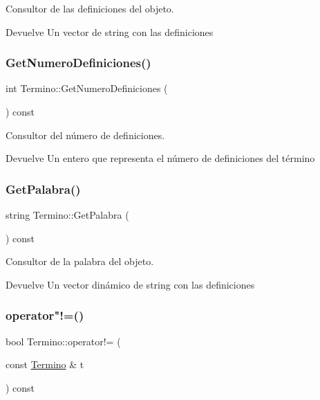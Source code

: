 Consultor de las definiciones del objeto. 

\begin{DoxyReturn}{Devuelve}
Un vector de string con las definiciones 
\end{DoxyReturn}
\mbox{\label{classTermino_ad3aac507f0f33d89abf34db00f92606f}} 
\subsubsection{\texorpdfstring{Get\+Numero\+Definiciones()}{GetNumeroDefiniciones()}}
{\footnotesize\ttfamily int Termino\+::\+Get\+Numero\+Definiciones (\begin{DoxyParamCaption}{ }\end{DoxyParamCaption}) const}



Consultor del número de definiciones. 

\begin{DoxyReturn}{Devuelve}
Un entero que representa el número de definiciones del término 
\end{DoxyReturn}
\mbox{\label{classTermino_a9cff6f16a62ffa3c8c2c241a33cbd04d}} 
\subsubsection{\texorpdfstring{Get\+Palabra()}{GetPalabra()}}
{\footnotesize\ttfamily string Termino\+::\+Get\+Palabra (\begin{DoxyParamCaption}{ }\end{DoxyParamCaption}) const}



Consultor de la palabra del objeto. 

\begin{DoxyReturn}{Devuelve}
Un vector dinámico de string con las definiciones 
\end{DoxyReturn}
\mbox{\label{classTermino_a18fcc1cd64321afc8e17bb7ddaa9172a}} 
\subsubsection{\texorpdfstring{operator"!=()}{operator!=()}}
{\footnotesize\ttfamily bool Termino\+::operator!= (\begin{DoxyParamCaption}\item[{const \hyperlink{classTermino}{Termino} \&}]{t }\end{DoxyParamCaption}) const}



